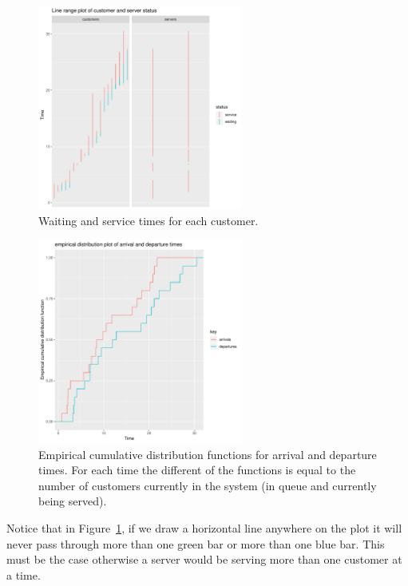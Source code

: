 \documentclass[article]{jss}
\begin{document}
\begin{figure}[!htb]
\centering
\includegraphics[width = 0.6\textwidth]{figures/customers_083.pdf}
\caption{Waiting and service times for each customer. }
\label{fig:customers}
\end{figure}

\begin{figure}[!htb]
\centering
\includegraphics[width = 0.6\textwidth]{figures/ecdf_083.pdf}
\caption{Empirical cumulative distribution functions for arrival and departure times. For each time the different of the functions is equal to the number of customers currently in the system (in queue and currently being served).}
\label{fig:ecdf}
\end{figure}

Notice that in Figure~\ref{fig:customers}, if we draw a horizontal line anywhere on the plot it will never pass through more than one green bar or more than one blue bar. This must be the case otherwise a server would be serving more than one customer at a time.
\end{document}
